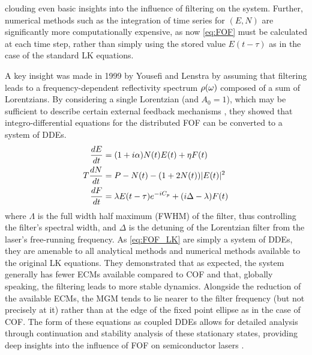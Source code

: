 clouding even basic insights into the influence of filtering on the system. 
Further, numerical methods such as the integration of time series for $(E,N)$ are significantly more computationally expensive, as now \eqref{eq:FOF} must be calculated at each time step, 
rather than simply using the stored value $E(t-\tau)$ as in the case of the standard LK equations.
%
\par
%
A key insight was made in 1999 by Yousefi and Lenstra \cite{yousefi1999dynamical} by assuming that filtering leads to a frequency-dependent reflectivity spectrum $\rho(\omega)$ composed of a sum of Lorentzians. 
By considering a single Lorentzian (and $A_0=1$), which may be sufficient to describe certain external feedback mechanisms \cite{dahmani1987frequency,detienne1997semiconductor}, 
they showed that integro-differential equations for the distributed FOF can be converted to a system of DDEs.
%
\begin{equation}
    \begin{aligned}
    \label{eq:FOF_LK}
        \frac{d E}{d t} &= (1+i \alpha) N(t) E(t)+\eta F(t) \\
        T \frac{d N}{d t} &= P - N(t) - (1 + 2 N(t))|E(t)|^2 \\
        \frac{d F}{d t} &= \lambda E(t-\tau) e^{-i C_p}+(i \Delta-\lambda) F(t)
    \end{aligned}
\end{equation}
%
where $\Lambda$ is the full width half maximum (FWHM) of the filter, thus controlling the filter's spectral width, and $\Delta$ is the detuning of the Lorentzian filter from the laser's free-running frequency. 
As \eqref{eq:FOF_LK} are simply a system of DDEs, they are amenable to all analytical methods and numerical methods available to the original LK equations. 
They demonstrated that as expected, the system generally has fewer ECMs available compared to COF and that, globally speaking, the filtering leads to more stable dynamics. 
Alongside the reduction of the available ECMs, the MGM tends to lie nearer to the filter frequency (but not precisely at it) rather than at the edge of the fixed point ellipse as in the case of COF. 
The form of these equations as coupled DDEs allows for detailed analysis through continuation and stability analysis of these stationary states, providing deep insights into the influence of FOF on semiconductor lasers 
\cite{erzgraber2006frequency, erzgraber2007bifurcation, erzgraber2007dynamics, fischer2000experimental, fischer2004experimental, green2006mode, hek2007semiconductor, 
erzgraber2007feedback, fischer2004filtered, yousefi2001global, yousefi2002simulations, yousefi2003nonlinear}. 
%
%
